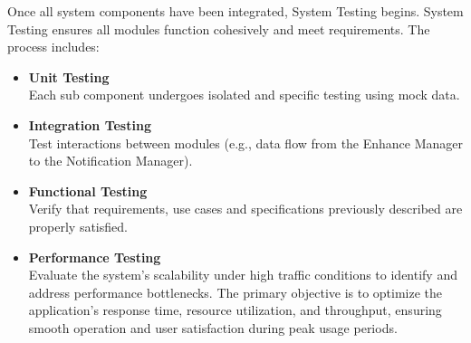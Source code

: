 Once all system components have been integrated, System Testing begins. System Testing ensures all modules function cohesively and meet requirements. The process includes:

\begin{itemize}
    \item 
\textbf{Unit Testing} \\
Each sub component undergoes isolated and specific testing using mock data.
    \item
\textbf{Integration Testing} \\
Test interactions between modules (e.g., data flow from the Enhance Manager to the Notification Manager).
    \item
\textbf{Functional Testing} \\
Verify that requirements, use cases and specifications previously described are properly satisfied.
    \item
\textbf{Performance Testing} \\
Evaluate the system's scalability under high traffic conditions to identify and address performance bottlenecks. The primary objective is to optimize the application's response time, resource utilization, and throughput, ensuring smooth operation and user satisfaction during peak usage periods.
\end{itemize}